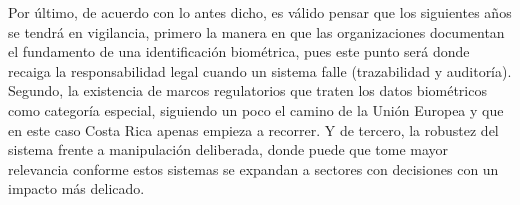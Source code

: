 Por último, de acuerdo con lo antes dicho, es válido pensar que los siguientes años se tendrá en vigilancia, primero la manera en que las organizaciones documentan el fundamento de una identificación biométrica, pues este punto será donde recaiga la responsabilidad legal cuando un sistema falle (trazabilidad y auditoría). Segundo, la existencia de marcos regulatorios que traten los datos biométricos como categoría especial, siguiendo un poco el camino de la Unión Europea y que en este caso Costa Rica apenas empieza a recorrer. Y de tercero, la robustez del sistema frente a manipulación deliberada, donde puede que tome mayor relevancia conforme estos sistemas se expandan a sectores con decisiones con un impacto más delicado.
